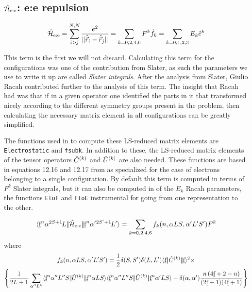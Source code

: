 \documentclass{article}
\begin{document}
\subsection{$\hat{\mathcal{H}}_\text{e:e}$: e:e repulsion}
 
\begin{equation}
    \hat{\mathcal{H}}_\text{e:e} = \sum_{i>j}^{N,N} \frac{e^2}{\lVert\hat{\vec{r}}_i-\hat{\vec{r}}_j\rVert} = \sum_{k=0,2,4,6} F^k \hat{f}_k = \sum_{k=0,1,2,3} E_k \hat{e}^k
\end{equation} 

This term is the first we will not discard. Calculating this term for the \fn configurations was one of the contribution from Slater, as such the parameters we use to write it up are called \textit{Slater integrals}. After the analysis from Slater, Giulio Racah contributed further to the analysis of this term. The insight that Racah had was that if in a given operator one identified the parts in it that transformed nicely according to the different symmetry groups present in the problem, then calculating the necessary matrix element in all \fn configurations can   be greatly simplified.

The functions used in \ql to compute these LS-reduced matrix elements are \texttt{Electrostatic} and \texttt{fsubk}. In addition to these, the LS-reduced matrix elements of the tensor operators $\hat{C}^{(k)}$ and $\hat{U}^{(k)}$ are also needed. These functions are based in equations 12.16 and 12.17 from \cowan  as specialized for the case of electrons belonging to a single \fn configuration. By default this term is computed in terms of $F^k$ Slater integrals, but it can also be computed in of the $E_k$ Racah parameters, the functions \texttt{EtoF} and \texttt{FtoE} instrumental for going from one representation to the other.
 
\begin{equation}
\langle \underbar{$\text{f}$}^n\alpha{}^{2S+1}{\kern-0.1em}{L}|\!|\hat{\mathcal{H}}_\text{e:e}|\!|\underbar{$\text{f}$}^n\alpha'{}^{2S'+1}{\kern-0.1em}{L'}\rangle = \sum_{k=0,2,4,6} f_k(n,\alpha{LS},\alpha'{L'S'}) F^k 
\end{equation} 
where
\begin{multline}
    f_k(n,\alpha{LS},\alpha'{L'S'}) = \frac{1}{2} 
        \delta(S,S')
        \delta(L,L')
        \langle \underbar{$\text{f}$}|\!|\hat{C}^{(k)}|\!|\underbar{$\text{f}$}\rangle^2 \times \\
        \left\{ 
            \frac{1}{2L+1} \sum_{\alpha''L''} 
                \langle \underbar{$\text{f}$}^n \alpha'' L'' S|\!|\hat{U}^{(k)}|\!|\underbar{$\text{f}$}^n \alpha L S\rangle 
            \langle \underbar{$\text{f}$}^n \alpha'' L'' S|\!|\hat{U}^{(k)}|\!|\underbar{$\text{f}$}^n \alpha' L S\rangle
            - \delta(\alpha,\alpha')
                \frac{n \left(4 \underbar{$\text{f}$} + 2 - n\right)}
                    {(2\underbar{$\text{f}$}+1)(4 \underbar{$\text{f}$} + 1)} 
        \right\}
\end{multline}      
\end{document}
